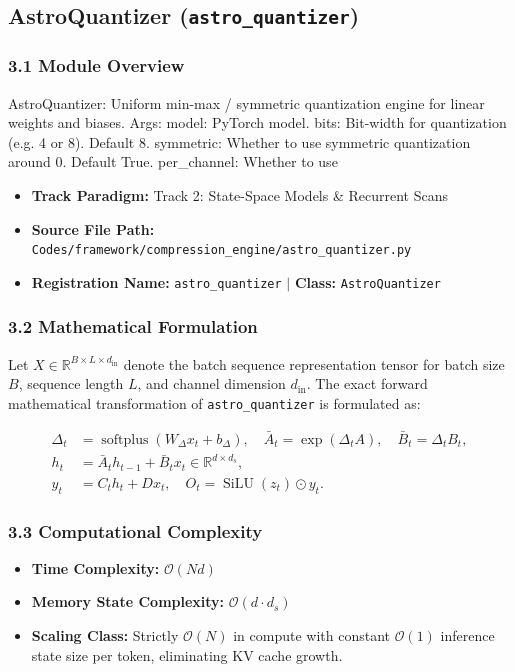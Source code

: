 \subsection{AstroQuantizer (\texttt{astro\_quantizer})}
\label{sec:app_module_astro_quantizer}

\subsubsection*{3.1 Module Overview}
AstroQuantizer: Uniform min-max / symmetric quantization engine for linear weights and biases.  Args:     model: PyTorch model.     bits: Bit-width for quantization (e.g. 4 or 8). Default 8.     symmetric: Whether to use symmetric quantization around 0. Default True.     per\_channel: Whether to use
\begin{itemize}
    \item \textbf{Track Paradigm:} Track 2: State-Space Models & Recurrent Scans
    \item \textbf{Source File Path:} \texttt{Codes/framework/compression\_engine/astro\_quantizer.py}
    \item \textbf{Registration Name:} \texttt{astro\_quantizer} $\mid$ \textbf{Class:} \texttt{AstroQuantizer}
\end{itemize}

\subsubsection*{3.2 Mathematical Formulation}
Let $X \in \mathbb{R}^{B \times L \times d_{\text{in}}}$ denote the batch sequence representation tensor for batch size $B$, sequence length $L$, and channel dimension $d_{\text{in}}$. The exact forward mathematical transformation of \texttt{astro\_quantizer} is formulated as:

\begin{align}
\Delta_t &= \operatorname{softplus}(W_\Delta x_t + b_\Delta), \quad \bar{A}_t = \exp(\Delta_t A), \quad \bar{B}_t = \Delta_t B_t, \\
h_t &= \bar{A}_t h_{t-1} + \bar{B}_t x_t \in \mathbb{R}^{d \times d_s}, \\
y_t &= C_t h_t + D x_t, \quad O_t = \operatorname{SiLU}(z_t) \odot y_t.
\end{align}


\subsubsection*{3.3 Computational Complexity}
\begin{itemize}
    \item \textbf{Time Complexity:} $\mathcal{O}(N d)$
    \item \textbf{Memory State Complexity:} $\mathcal{O}(d \cdot d_s)$
    \item \textbf{Scaling Class:} Strictly $\mathcal{O}(N)$ in compute with constant $\mathcal{O}(1)$ inference state size per token, eliminating KV cache growth.
\end{itemize}

